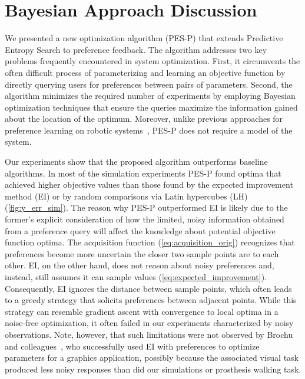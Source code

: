 \section{Bayesian Approach Discussion}\label{sec:tuning_discussion}
We presented a new optimization algorithm (PES-P) that extends Predictive
Entropy Search to preference feedback. The algorithm addresses two key problems
frequently encountered in system optimization. First, it circumvents the often
difficult process of parameterizing and learning an objective function by
directly querying users for preferences between pairs of parameters. Second, the
algorithm minimizes the required number of experiments by employing Bayesian
optimization techniques that ensure the queries maximize the information gained
about the location of the optimum. Moreover, unlike previous approaches for
preference learning on robotic systems~\citep{wilson2012bayesian,
jain2013learning}, PES-P does not require a model of the system.

Our experiments show that the proposed algorithm outperforms baseline
algorithms. In most of the simulation experiments PES-P found optima that
achieved higher objective values than those found by the expected improvement
method (EI) or by random comparisons via Latin hypercubes (LH)
(\cref{fig:y_err_sim}). The reason why PES-P outperformed EI is likely due to
the former's explicit consideration of how the limited, noisy information
obtained from a preference query will affect the knowledge about potential
objective function optima. The acquisition function (\cref{eq:acquisition_orig})
recognizes that preferences become more uncertain the closer two sample points
are to each other. EI, on the other hand, does not reason about noisy
preferences and, instead, still assumes it can sample values
(\cref{eq:expected_improvement}). Consequently, EI ignores the distance between
sample points, which often leads to a greedy strategy that solicits preferences
between adjacent points. While this strategy can resemble gradient ascent with
convergence to local optima in a noise-free optimization, it often failed in our
experiments characterized by noisy observations. Note, however, that such
limitations were not observed by Brochu and colleagues~\citep{eric2008active},
who successfully used EI with preferences to optimize parameters for a graphics
application, possibly because the associated visual task produced less noisy
responses than did our simulations or prosthesis walking task. 

